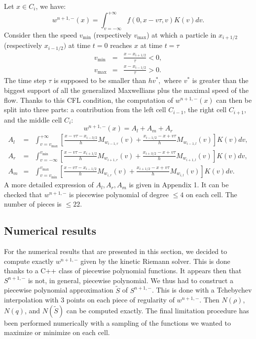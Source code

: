 \documentclass{fldauth}
\theoremstyle{plain}
\theoremstyle{plain}
\theoremstyle{plain}
\theoremstyle{plain}
\theoremstyle{plain}
\theoremstyle{plain}
\begin{document}
Let \( x\in C_{i} \), we have:
\[
w^{n+1,-}(x)=\int _{v=-\infty }^{+\infty }f(0,x-v\tau ,v)K(v)dv.\]
 Consider then the speed \( v_{\min } \) (respectively \( v_{\max } \)) at
which a particle in \( x_{i+1/2} \) (respectively \( x_{i-1/2}) \) at time
\( t=0 \) reaches \( x \) at time \( t=\tau  \)
\begin{eqnarray*}
v_{\min } & = & \frac{x-x_{i+1/2}}{\tau }<0,\\
v_{\max } & = & \frac{x-x_{i-1/2}}{\tau }>0.
\end{eqnarray*}
 The time step \( \tau  \) is supposed to be smaller than \( hv^{*}, \) where
\( v^{*} \) is greater than the biggest support of all the
generalized Maxwellians plus the maximal speed of the flow. Thanks
to this CFL condition, the computation of \( w^{n+1,-}(x) \) can
then be split into three parts: a contribution from the left cell
\( C_{i-1} \), the right cell \( C_{i+1} \), and the middle cell
\( C_{i} \):
\[
w^{n+1,-}(x)=A_{l}+A_{m}+A_{r}\]
\begin{eqnarray*}
A_{l} & = & \int _{v=v_{\max }}^{+\infty }\left[ \frac{x-v\tau -x_{i-3/2}}{h}M_{w_{i-1,r}}(v)+\frac{x_{i-1/2}-x+v\tau }{h}M_{w_{i-1,l}}(v)\right] K(v)dv,\\
A_{r} & = & \int _{v=-\infty }^{v_{\min }}\left[ \frac{x-v\tau -x_{i+1/2}}{h}M_{w_{i+1,r}}(v)+\frac{x_{i+3/2}-x+v\tau }{h}M_{w_{i+1,l}}(v)\right] K(v)dv,\\
A_{m} & = & \int _{v=v_{\min }}^{v_{\max }}\left[ \frac{x-v\tau -x_{i-1/2}}{h}M_{w_{i,r}}(v)+\frac{x_{i+1/2}-x+v\tau }{h}M_{w_{i,l}}(v)\right] K(v)dv.
\end{eqnarray*}
 A more detailed expression of \( A_{l},A_{r},A_{m} \) is given in Appendix 1.
It can be checked that \( w^{n+1,-} \) is piecewise polynomial of degree \( \leq 4 \)
on each cell. The number of pieces is \( \leq 22. \)


\subsection{Numerical results}

For the numerical results that are presented in this section, we
decided to compute exactly \( w^{n+1,-} \) given by the kinetic
Riemann solver. This is done thanks to a C++ class of piecewise
polynomial functions. It appears then that \( S^{n+1,-} \) is not,
in general, piecewise polynomial. We thus had to construct a
piecewise polynomial approximation \( \tilde{S} \) of \( S^{n+1,-}
\). This is done with a Tchebychev interpolation with 3 points on
each piece of regularity of \( w^{n+1,-} \). Then \( N(\rho ) \),
\( N(q) \), and \( N(\tilde{S}) \) can be computed exactly. The
final limitation procedure has been performed numerically with a
sampling of the functions we wanted to maximize or minimize on
each cell.
\end{document}
